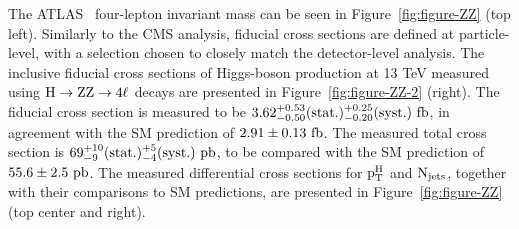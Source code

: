 \documentclass[10pt]{article}
\begin{document}
The ATLAS~\cite{ATLAS-ZZ} four-lepton invariant mass can be seen in
Figure~\ref{fig:figure-ZZ} (top left). Similarly to the CMS analysis, fiducial
cross sections are defined at particle-level, with a selection chosen
to closely match the detector-level analysis. The inclusive fiducial cross
sections of Higgs-boson production at 13 TeV measured using
${\rm H \to ZZ \to 4\ell}$ decays are presented in Figure~\ref{fig:figure-ZZ-2}
(right). The fiducial cross section is measured
to be ${\rm 3.62_{-0.50}^{+0.53}(stat.)_{-0.20}^{+0.25}(syst.)~fb}$, in agreement
with the SM prediction of ${\rm 2.91 \pm 0.13~fb}$. The measured total cross section is
${\rm 69_{-9}^{+10}(stat.)_{-4}^{+5}(syst.)~pb}$, to be compared with the
SM prediction of ${\rm 55.6 \pm 2.5~pb}$. The measured differential cross sections
for ${\rm p_T^{H}}$ and ${\rm N_{jets}}$, together with their comparisons to SM
predictions, are presented in Figure~\ref{fig:figure-ZZ} (top center and right).
\end{document}
